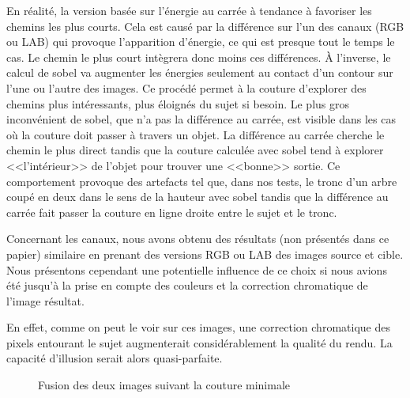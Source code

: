 \documentclass[a4paper]{article}
\begin{document}
En réalité, la version basée sur l'énergie au carrée à tendance à favoriser les chemins les plus courts.
Cela est causé par la différence sur l'un des canaux (RGB ou LAB) qui provoque l'apparition d'énergie, ce qui
est presque tout le temps le cas. Le chemin le plus court intègrera donc moins ces différences. 
À l'inverse, le calcul de sobel va augmenter les énergies seulement au contact d'un contour sur l'une ou
l'autre des images. Ce procédé permet à la couture d'explorer des chemins plus intéressants,
plus éloignés du sujet si besoin. 
Le plus gros inconvénient de sobel, que n'a pas la différence au carrée, est visible dans les cas où la couture doit
passer à travers un objet. La différence au carrée cherche le chemin le plus direct tandis que la couture
calculée avec sobel tend à explorer <<l'intérieur>> de l'objet pour trouver une <<bonne>> sortie.
Ce comportement provoque des artefacts tel que, dans nos tests, le tronc d'un arbre coupé en deux dans le sens
de la hauteur avec sobel tandis que la différence au carrée fait passer la couture en ligne droite entre le sujet et le
tronc.

Concernant les canaux, nous avons obtenu des résultats (non présentés dans ce papier) similaire en prenant des versions RGB
ou LAB des images source et cible. Nous présentons cependant une potentielle influence de ce choix si nous
avions été jusqu'à la prise en compte des couleurs et la correction chromatique de l'image résultat.

En effet, comme on peut le voir sur ces images, une correction chromatique des pixels entourant le sujet augmenterait considérablement la qualité du rendu. La capacité  d'illusion serait alors quasi-parfaite.

\begin{figure}[!ht]%
    \centering
    \hspace{0.030\textwidth}
    \caption{Fusion des deux images suivant la couture minimale}
    \label{resultsA}
\end{figure}
\end{document}
